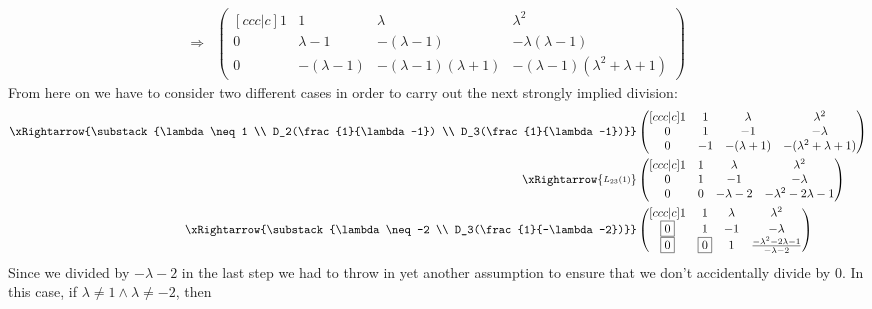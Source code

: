 \begin{exm}
\begin{flushleft}
\begin{align}
			\Longrightarrow
			 & \begin{pmatrix}[ccc|c]
				1 & 1            & \lambda                 & \lambda^2                         \\
				0 & \lambda-1    & -(\lambda-1)            & -\lambda(\lambda-1)               \\
				0 & -(\lambda-1) & -(\lambda-1)(\lambda+1) & -(\lambda-1)(\lambda^2+\lambda+1)
			\end{pmatrix}\label{case12}
		\end{align}
		From here on we have to consider two different cases in order to carry
		out the next strongly implied division:
		\begin{align}
			\xRightarrow{\substack{\lambda \neq 1       \\ D_2(\frac{1}{\lambda-1}) \\ D_3(\frac{1}{\lambda-1})}}
			 & \begin{pmatrix}[ccc|c]
				1 & 1  & \lambda      & \lambda^2              \\
				0 & 1  & -1           & -\lambda               \\
				0 & -1 & -(\lambda+1) & -(\lambda^2+\lambda+1)
			\end{pmatrix}\nonumber      \\
			\xRightarrow{\substack{L_{23}(1)}}
			 & \begin{pmatrix}[ccc|c]
				1 & 1 & \lambda    & \lambda^2             \\
				0 & 1 & -1         & -\lambda              \\
				0 & 0 & -\lambda-2 & -\lambda^2-2\lambda-1
			\end{pmatrix}\label{case34} \\
			\xRightarrow{\substack{\lambda \neq -2      \\ D_3(\frac{1}{-\lambda-2})}}
			 & \begin{pmatrix}[ccc|c]
				1         & 1         & \lambda & \lambda^2                                \\
				\boxed{0} & 1         & -1      & -\lambda                                 \\
				\boxed{0} & \boxed{0} & 1       & \frac{-\lambda^2-2\lambda-1}{-\lambda-2}
			\end{pmatrix}\nonumber
		\end{align}
		Since we divided by $-\lambda-2$ in the last step we had to throw in yet
		another assumption to ensure that we don't accidentally divide by $0$.
		In this case, if $\lambda\neq 1 \land \lambda \neq -2$, then

\end{flushleft}
\end{exm}
